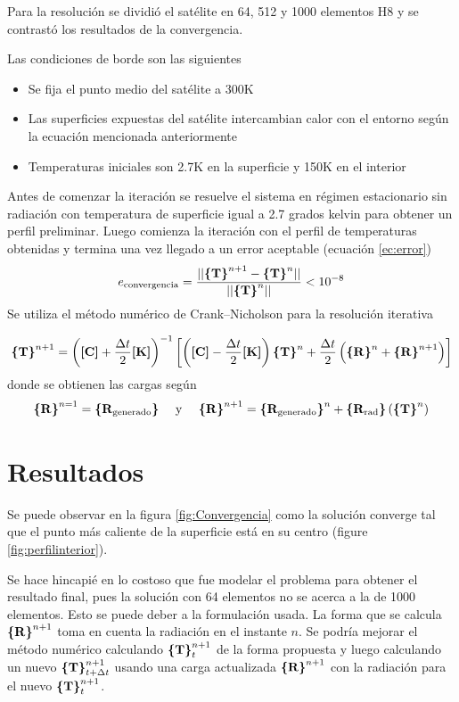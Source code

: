 \documentclass[onecolumn,10pt,titlepage,a4paper]{article}
\begin{document}
Para la resolución se dividió el satélite en 64, 512 y 1000 elementos H8 y se contrastó los resultados de la convergencia.

Las condiciones de borde son las siguientes
\begin{itemize}
	\item Se fija el punto medio del satélite a 300K
	\item Las superficies expuestas del satélite intercambian calor con el entorno según la ecuación mencionada anteriormente
	\item Temperaturas iniciales son 2.7K en la superficie y 150K en el interior
\end{itemize}
Antes de comenzar la iteración se resuelve el sistema en régimen estacionario sin radiación con temperatura de superficie igual a 2.7 grados kelvin para obtener un perfil preliminar. Luego comienza la iteración con el perfil de temperaturas obtenidas y termina una vez llegado a un error aceptable (ecuación \ref{ec:error})
\begin{equation}\label{ec:error}
	e_{\mathrm{convergencia}}=\frac{||\boldsymbol{\{ }\mathbf{T} \boldsymbol{\}}^{n+1}-\boldsymbol{\{ }\mathbf{T} \boldsymbol{\}}^{n}||}{||\boldsymbol{\{ }\mathbf{T} \boldsymbol{\}}^{n}||} < 10^{-8}
\end{equation}
Se utiliza el método numérico de Crank--Nicholson para la resolución iterativa

\begin{equation}
		\boldsymbol{\{ }\mathbf{T} \boldsymbol{\}}^{n+1} = \left( \boldsymbol{[}\mathbf{C} \boldsymbol{]} + \frac{\Delta t}{2} \boldsymbol{[}\mathbf{K} \boldsymbol{]} \right)^{-1} \left[ \left(\boldsymbol{[}\mathbf{C} \boldsymbol{]} -\frac{\Delta t}{2} \boldsymbol{[}\mathbf{K} \boldsymbol{]}\right) \boldsymbol{\{ }\mathbf{T} \boldsymbol{\}}^n +\frac{\Delta t}{2} \left(\boldsymbol{\{ }\mathbf{R} \boldsymbol{\}}^n + \boldsymbol{\{ }\mathbf{R} \boldsymbol{\}}^{n+1}  \right)\right]
\end{equation}
donde se obtienen las cargas según
\[
\boldsymbol{\{ }\mathbf{R} \boldsymbol{\}}^{n=1} = \boldsymbol{\{ }\mathbf{R_{\mathrm{generado}}} \boldsymbol{\}} \quad \text{ y } \quad \boldsymbol{\{ }\mathbf{R} \boldsymbol{\}}^{n+1} = \boldsymbol{\{ }\mathbf{R_{\mathrm{generado}}} \boldsymbol{\}}^{n} + \boldsymbol{\{ }\mathbf{R_{\mathrm{rad}}} \boldsymbol{\}}\left(\boldsymbol{\{ }\mathbf{T} \boldsymbol{\}}^{n} \right)
\]
\section*{Resultados}
Se puede observar en la figura \ref{fig:Convergencia} como la solución converge tal que el punto más caliente de la superficie está en su centro (figure \ref{fig:perfilinterior}). 

Se hace hincapié en lo costoso que fue modelar el problema para obtener el resultado final, pues la solución con 64 elementos no se acerca a la de 1000 elementos. Esto se puede deber a la formulación usada. La forma que se calcula $\boldsymbol{\{ }\mathbf{R} \boldsymbol{\}}^{n+1}$ toma en cuenta la radiación en el instante $n$. Se podría mejorar el método numérico calculando $\boldsymbol{\{ }\mathbf{T} \boldsymbol{\}}^{n+1}_{t}$ de la forma propuesta y luego calculando un nuevo $\boldsymbol{\{ }\mathbf{T} \boldsymbol{\}}^{n+1}_{t+\Delta t}$ usando una carga actualizada $\boldsymbol{\{ }\mathbf{R} \boldsymbol{\}}^{n+1}$ con la radiación para el nuevo $\boldsymbol{\{ }\mathbf{T} \boldsymbol{\}}^{n+1}_{t}$. 
\end{document}
